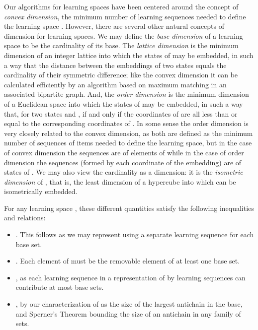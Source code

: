 \documentclass[11pt]{llncs}
\begin{document}
{Our algorithms for learning spaces have been centered around the concept of \emph{convex dimension}, the minimum number  of learning sequences needed to define the learning space .
However, there are several other natural concepts of dimension for learning spaces.
We may define the \emph{base dimension} of a learning space  to be the cardinality of its base.
The \emph{lattice dimension}  \citep{eppst05} is the minimum dimension  of an integer lattice  into which the states of  may be embedded, in such a way that the  distance between the embeddings of two states equals the cardinality of their symmetric difference; like the convex dimension it can be calculated efficiently by an algorithm based on maximum matching in an associated bipartite graph. And, the \emph{order dimension} 
is the minimum dimension  of a Euclidean space  into which the states of  may be embedded, in such a way that, for two states  and ,  if and only if the coordinates of  are all less than or equal to the corresponding coordinates of . In some sense the order dimension is very closely related to the convex dimension, as both are defined as the minimum number of sequences of items needed to define the learning space, but in the case of convex dimension the sequences are of elements of  while in the case of order dimension the sequences (formed by each coordinate of the embedding) are of states of . We may also view the cardinality  as a dimension: it is the \emph{isometric dimension} of , that is, the least dimension of a hypercube into which  can be isometrically embedded.

For any learning space , these different quantities satisfy the following inequalities and relations:

\begin{itemize}
\item . This follows as we may represent  using a separate learning sequence for each base set.

\item . Each element of  must be the removable element of at least one base set.

\item , as each learning sequence in a representation of  by learning sequences can contribute at most  base sets.

\item , by our characterization of  as the size of the largest antichain in the base, and Sperner's Theorem bounding the size of an antichain in any family of sets.


\end{itemize}}
\end{document}
